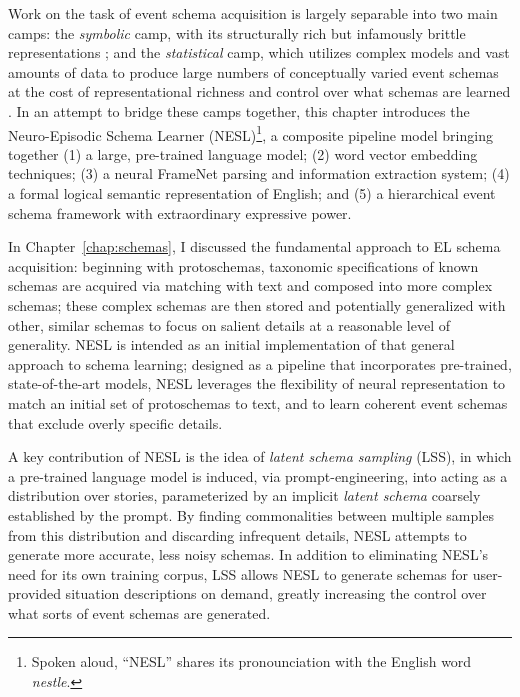 Work on the task of event schema acquisition is largely separable into two main camps: the \textit{symbolic} camp, with its structurally rich but infamously brittle representations \citep{lebowitz1980,norvig1987inference,mooney1990general}; and the \textit{statistical} camp, which utilizes complex models and vast amounts of data to produce large numbers of conceptually varied event schemas at the cost of representational richness and control over what schemas are learned \citep{chambers2008unsupervised,pichotta2016learning,wanzare2017inducing}. In an attempt to bridge these camps together, this chapter introduces the Neuro-Episodic Schema Learner (NESL)\footnote{Spoken aloud, ``NESL'' shares its pronounciation with the English word \textit{nestle}.}, a composite pipeline model bringing together (1) a large, pre-trained language model; (2) word vector embedding techniques; (3) a neural FrameNet parsing and information extraction system; (4) a formal logical semantic representation of English; and (5) a hierarchical event schema framework with extraordinary expressive power.

In Chapter~\ref{chap:schemas}, I discussed the fundamental approach to EL schema acquisition: beginning with protoschemas, taxonomic specifications of known schemas are acquired via matching with text and composed into more complex schemas; these complex schemas are then stored and potentially generalized with other, similar schemas to focus on salient details at a reasonable level of generality. NESL is intended as an initial implementation of that general approach to schema learning; designed as a pipeline that incorporates pre-trained, state-of-the-art models, NESL leverages the flexibility of neural representation to match an initial set of protoschemas to text, and to learn coherent event schemas that exclude overly specific details.

A key contribution of NESL is the idea of \textit{latent schema sampling} (LSS), in which a pre-trained language model is induced, via prompt-engineering, into acting as a distribution over stories, parameterized by an implicit \textit{latent schema} coarsely established by the prompt. By finding commonalities between multiple samples from this distribution and discarding infrequent details, NESL attempts to generate more accurate, less noisy schemas. In addition to eliminating NESL's need for its own training corpus, LSS allows NESL to generate schemas for user-provided situation descriptions on demand, greatly increasing the control over what sorts of event schemas are generated.

